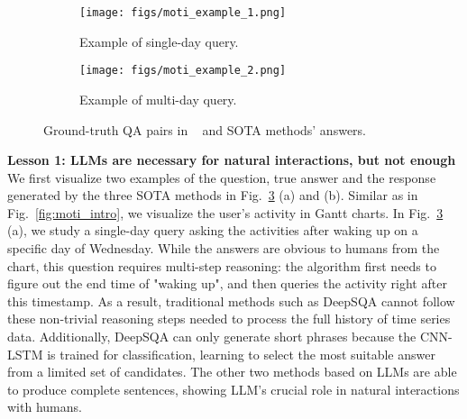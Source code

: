 


\begin{figure}[t]
    \centering
    \begin{subfigure}[b]{0.85\textwidth}
        \centering
        \texttt{[image: figs/moti\_example\_1.png]}
        \vspace{-6mm}
        \caption{Example of single-day query.}
        \label{fig:daily-time}
    \end{subfigure} %
    
    \begin{subfigure}[b]{0.85\textwidth}
        \centering
        \texttt{[image: figs/moti\_example\_2.png]}
        \vspace{-6mm}
        \caption{Example of multi-day query.}
        \label{fig:weekly-day}
    \end{subfigure}
    \vspace{-4mm}
    \caption{Ground-truth QA pairs in \Dataset~\cite{sensorqa} and SOTA methods' answers.}
    \label{fig:example_qas}
    \vspace{-4mm}
\end{figure}


\textbf{Lesson 1: LLMs are necessary for natural interactions, but not enough}
We first visualize two examples of the question, true answer and the response generated by the three SOTA methods in Fig.~\ref{fig:example_qas} (a) and (b).
Similar as in Fig.~\ref{fig:moti_intro}, we visualize the user's activity in Gantt charts.
In Fig.~\ref{fig:example_qas} (a), we study a single-day query asking the activities after waking up on a specific day of Wednesday.
While the answers are obvious to humans from the chart, this question requires multi-step reasoning: the algorithm first needs to figure out the end time of "waking up", and then queries the activity right after this timestamp.
As a result, traditional methods such as DeepSQA cannot follow these non-trivial reasoning steps needed to process the full history of time series data. Additionally, DeepSQA can only generate short phrases because the CNN-LSTM is trained for classification, learning to select the most suitable answer from a limited set of candidates.
The other two methods based on LLMs are able to produce complete sentences, showing LLM's crucial role in natural interactions with humans.

